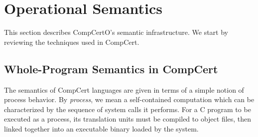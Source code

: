 \documentclass[sigplan,screen]{acmart}
\newenvironment{optional}{}{}
\begin{document}


\section{Operational Semantics} \label{sec:sem} %

This section describes CompCertO's semantic infrastructure.
We start by reviewing the techniques used in CompCert.

\subsection{Whole-Program Semantics in CompCert} \label{sec:sem:closed} %


The semantics of CompCert languages
are given in terms of a simple notion of process behavior.
By \emph{process}, we mean a self-contained computation
which can be characterized by
the sequence of system calls it performs.
For a C program to be executed as a process,
its translation units must be compiled to object files,
then linked together
into an executable binary
loaded by the system.

%
%
\end{document}
